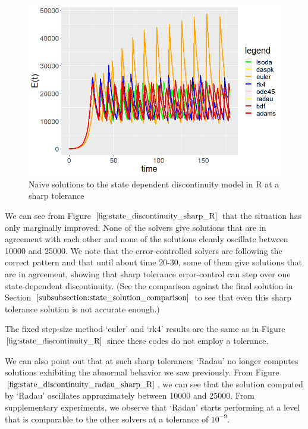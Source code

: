 \begin{figure}[H]
\centering
\includegraphics[width=0.7\linewidth]{./figures/state_discontinuity_sharp_R}
\caption{Naive solutions to the state dependent discontinuity model in R at a sharp tolerance}
\label{fig:state_discontinuity_sharp_R}
\end{figure}

We can see from Figure $\ref{fig:state_discontinuity_sharp_R}$ that the situation has only marginally improved. None of the solvers give solutions that are in agreement with each other and none of the solutions cleanly oscillate between 10000 and 25000. We note that the error-controlled solvers are following the correct pattern and that until about time 20-30, some of them give solutions that are in agreement, showing that sharp tolerance error-control can step over one state-dependent discontinuity. (See the comparison against the final solution in Section $\ref{subsubsection:state_solution_comparison}$ to see that even this sharp tolerance solution is not accurate enough.)

The fixed step-size method `euler' and `rk4' results are the same as in Figure $\ref{fig:state_discontinuity_R}$ since these codes do not employ a tolerance.

We can also point out that at such sharp tolerances `Radau' no longer computes solutions exhibiting the abnormal behavior we saw previously. From Figure $\ref{fig:state_discontinuity_radau_sharp_R}$, we can see that the solution computed by `Radau' oscillates approximately between 10000 and 25000. From supplementary experiments, we observe that `Radau' starts performing at a level that is comparable to the other solvers at a tolerance of $10^{-9}$.

